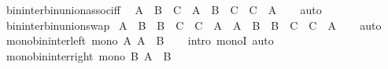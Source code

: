 \begin{isabellebody}
\ bin{\isacharunderscore}{\kern0pt}inter{\isacharunderscore}{\kern0pt}bin{\isacharunderscore}{\kern0pt}union{\isacharunderscore}{\kern0pt}assoc{\isacharunderscore}{\kern0pt}iff{\isacharcolon}{\kern0pt}\isanewline
\ \ {\isachardoublequoteopen}{\isacharparenleft}{\kern0pt}A\ {\isasyminter}\ B{\isacharparenright}{\kern0pt}\ {\isasymunion}\ C\ {\isacharequal}{\kern0pt}\ A\ {\isasyminter}\ {\isacharparenleft}{\kern0pt}B\ {\isasymunion}\ C{\isacharparenright}{\kern0pt}\ {\isasymlongleftrightarrow}\ C\ {\isasymsubseteq}\ A{\isachardoublequoteclose}\isanewline
%
\isadelimproof
\ \ %
\endisadelimproof
%
\isatagproof
{}\isamarkupfalse%
\ auto%
\endisatagproof
{\isafoldproof}%
%
\isadelimproof
\isanewline
%
\endisadelimproof
\isanewline
{}\isamarkupfalse%
\ bin{\isacharunderscore}{\kern0pt}inter{\isacharunderscore}{\kern0pt}bin{\isacharunderscore}{\kern0pt}union{\isacharunderscore}{\kern0pt}swap{}{\isacharcolon}{\kern0pt}\isanewline
\ {\isachardoublequoteopen}{\isacharparenleft}{\kern0pt}A\ {\isasyminter}\ B{\isacharparenright}{\kern0pt}\ {\isasymunion}\ {\isacharparenleft}{\kern0pt}B\ {\isasyminter}\ C{\isacharparenright}{\kern0pt}\ {\isasymunion}\ {\isacharparenleft}{\kern0pt}C\ {\isasyminter}\ A{\isacharparenright}{\kern0pt}\ {\isacharequal}{\kern0pt}\ {\isacharparenleft}{\kern0pt}A\ {\isasymunion}\ B{\isacharparenright}{\kern0pt}\ {\isasyminter}\ {\isacharparenleft}{\kern0pt}B\ {\isasymunion}\ C{\isacharparenright}{\kern0pt}\ {\isasyminter}\ {\isacharparenleft}{\kern0pt}C\ {\isasymunion}\ A{\isacharparenright}{\kern0pt}{\isachardoublequoteclose}\isanewline
%
\isadelimproof
\ \ %
\endisadelimproof
%
\isatagproof
{}\isamarkupfalse%
\ auto%
\endisatagproof
{\isafoldproof}%
%
\isadelimproof
\isanewline
%
\endisadelimproof
\isanewline
{}\isamarkupfalse%
\ mono{\isacharunderscore}{\kern0pt}bin{\isacharunderscore}{\kern0pt}inter{\isacharunderscore}{\kern0pt}left{\isacharcolon}{\kern0pt}\ {\isachardoublequoteopen}mono\ {\isacharparenleft}{\kern0pt}{\isasymlambda}A{\isachardot}{\kern0pt}\ A\ {\isasyminter}\ B{\isacharparenright}{\kern0pt}{\isachardoublequoteclose}\isanewline
%
\isadelimproof
\ \ %
\endisadelimproof
%
\isatagproof
{}\isamarkupfalse%
\ {\isacharparenleft}{\kern0pt}intro\ monoI{\isacharparenright}{\kern0pt}\ auto%
\endisatagproof
{\isafoldproof}%
%
\isadelimproof
\isanewline
%
\endisadelimproof
\isanewline
{}\isamarkupfalse%
\ mono{\isacharunderscore}{\kern0pt}bin{\isacharunderscore}{\kern0pt}inter{\isacharunderscore}{\kern0pt}right{\isacharcolon}{\kern0pt}\ {\isachardoublequoteopen}mono\ {\isacharparenleft}{\kern0pt}{\isasymlambda}B{\isachardot}{\kern0pt}\ A\ {\isasyminter}\ B{\isacharparenright}{\kern0pt}{\isachardoublequoteclose}\isanewline

\end{isabellebody}

